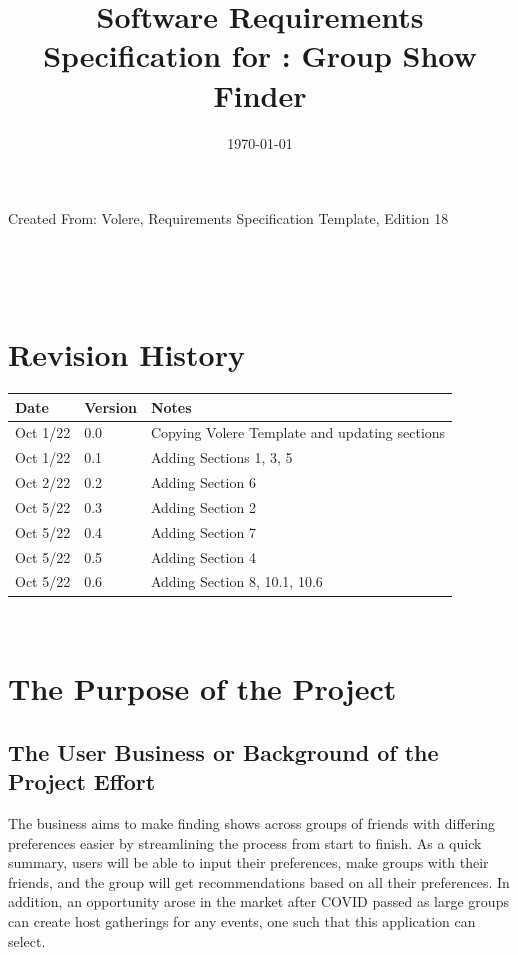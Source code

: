 \documentclass[12pt]{article}
\begin{document}
\title{Software Requirements Specification for \progname: Group Show Finder} 
\author{\authname}
\date{\today}
	
\maketitle
\vspace*{\fill}
Created From: Volere, Requirements Specification Template, Edition 18


~\newpage {}

\tableofcontents

~\newpage

\section*{Revision History}

\begin{tabularx}{\textwidth}{p{3cm}p{2cm}X}
\toprule {\bf Date} & {\bf Version} & {\bf Notes}\\
\midrule
Oct 1/22 & 0.0 & Copying Volere Template and updating sections\\
Oct 1/22 & 0.1 & Adding Sections 1, 3, 5\\
Oct 2/22 & 0.2 & Adding Section 6\\
Oct 5/22 & 0.3 & Adding Section 2\\
Oct 5/22 & 0.4 & Adding Section 7\\
Oct 5/22 & 0.5 & Adding Section 4\\
Oct 5/22 & 0.6 & Adding Section 8, 10.1, 10.6\\
\bottomrule
\end{tabularx}

~\newpage {}

\section{The Purpose of the Project}

\subsection{The User Business or Background of the Project Effort}
The business aims to make finding shows across groups of friends with differing preferences easier by streamlining the process from start to finish. As a quick summary, users will be able to input their preferences, make groups with their friends, and the group will get recommendations based on all their preferences. In addition, an opportunity arose in the market after COVID passed as large groups can create host gatherings for any events, one such that this application can select.
\end{document}
